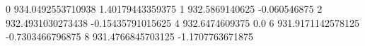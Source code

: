 0 934.0492553710938 1.40179443359375
1 932.5869140625 -0.060546875
2 932.4931030273438 -0.15435791015625
4 932.6474609375 0.0
6 931.9171142578125 -0.7303466796875
8 931.4766845703125 -1.1707763671875
